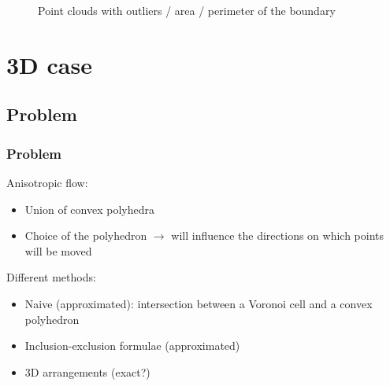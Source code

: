 \documentclass{beamer}
\begin{document}
\begin{frame}
\begin{figure}
        \caption{Point clouds with outliers / area / perimeter of the boundary}
    \end{figure}
\end{frame}

\section{3D case}

\subsection{Problem}
\begin{frame}
    \frametitle{Problem}

    Anisotropic flow:
    \begin{itemize}
        \item Union of convex polyhedra
        \item Choice of the polyhedron $ \to $ will influence the directions
            on which points will be moved
    \end{itemize}

    Different methods:
    \begin{itemize}
        \item Naive (approximated): intersection between a Voronoi cell and a
            convex polyhedron
        \item Inclusion-exclusion formulae (approximated)
        \item 3D arrangements (exact?)
    \end{itemize}
\end{frame}
\end{document}
